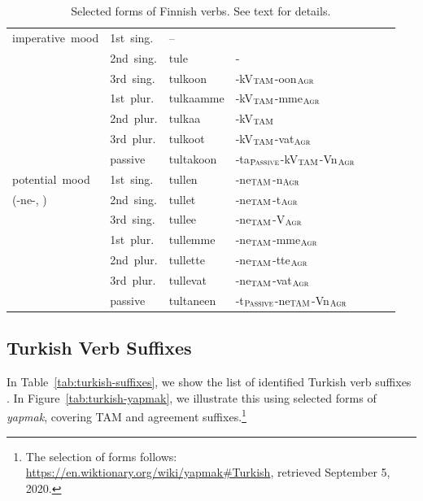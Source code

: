 \documentclass[11pt,letterpaper]{article}
\begin{document}
\begin{table}
\begin{tabular}{l|llllll}
	imperative mood  &1st sing. &	-- \\ 
	 \cite[Section 66]{karlsson1999finnish}	 & 2nd sing. &	tule & - \\ 
	&	3rd sing. &	tulkoon  & -kV$_{\textsc{TAM}}$-oon$_{\textsc{Agr}}$\\ 
	&	1st plur. &	tulkaamme  & -kV$_{\textsc{TAM}}$-mme$_{\textsc{Agr}}$\\ 
	&	2nd plur. &	tulkaa   & -kV$_{\textsc{TAM}}$\\ 
	&	3rd plur. 	&tulkoot  & -kV$_{\textsc{TAM}}$-vat$_{\textsc{Agr}}$\\ 
	&	passive 	&tultakoon  & -ta$_{\textsc{Passive}}$-kV$_{\textsc{TAM}}$-Vn$_{\textsc{Agr}}$\\ \hline
	potential mood 	 &	1st sing. &	tullen  & -ne$_{\textsc{TAM}}$-n$_{\textsc{Agr}}$\\ 
		(-ne-, \cite[Section 67]{karlsson1999finnish}) & 2nd sing. &	tullet  & -ne$_{\textsc{TAM}}$-t$_{\textsc{Agr}}$\\ 
	&	3rd sing. &	tullee  & -ne$_{\textsc{TAM}}$-V$_{\textsc{Agr}}$\\ 
	&	1st plur. &	tullemme  & -ne$_{\textsc{TAM}}$-mme$_{\textsc{Agr}}$\\ 
	&	2nd plur. &	tullette  & -ne$_{\textsc{TAM}}$-tte$_{\textsc{Agr}}$\\ 
	&	3rd plur. &	tullevat  & -ne$_{\textsc{TAM}}$-vat$_{\textsc{Agr}}$\\ 
	&	passive &	tultaneen  & -t$_{\textsc{Passive}}$-ne$_{\textsc{TAM}}$-Vn$_{\textsc{Agr}}$ \\ \hline
\end{tabular}
	\caption{Selected forms of Finnish verbs. See text for details.}\label{tab:finnish}
\end{table}

\subsection{Turkish Verb Suffixes}

In Table~\ref{tab:turkish-suffixes}, we show the list of identified Turkish verb suffixes \citep{schaaik2020turkish}.
In Figure~\ref{tab:turkish-yapmak}, we illustrate this using selected forms of \textit{yapmak}, covering TAM and agreement suffixes.\footnote{The selection of forms follows: \url{https://en.wiktionary.org/wiki/yapmak\#Turkish}, retrieved September 5, 2020.}
\end{document}
